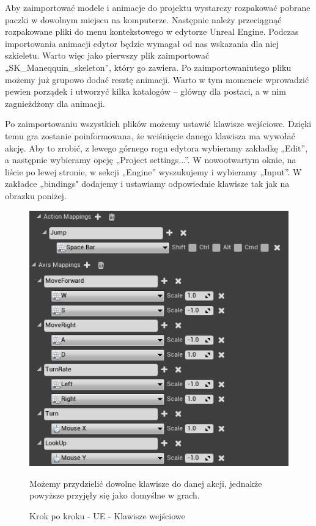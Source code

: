 \documentclass[12pt]{xmgr}
\begin{document}
Aby zaimportować modele i animacje do projektu wystarczy rozpakować pobrane paczki w dowolnym miejscu na komputerze. Następnie należy przeciągnąć rozpakowane pliki do menu kontekstowego w edytorze Unreal Engine. Podczas importowania animacji edytor będzie wymagał od nas wskazania dla niej szkieletu. Warto więc jako pierwszy plik zaimportować „SK\_Maneqquin\_skeleton”, który go zawiera. Po zaimportowaniutego pliku możemy już grupowo dodać resztę animacji. Warto w tym momencie wprowadzić pewien porządek i utworzyć kilka katalogów – główny dla postaci, a w nim zagnieżdżony dla animacji.

Po zaimportowaniu wszystkich plików możemy ustawić klawisze wejściowe. Dzięki temu gra zostanie poinformowana, że wciśnięcie danego klawisza ma wywołać akcję. Aby to zrobić, z lewego górnego rogu edytora wybieramy zakładkę „Edit”, a następnie wybieramy opcję „Project settings...”. W nowootwartym oknie, na liście po lewej stronie, w sekcji „Engine” wyszukujemy i wybieramy „Input”. W zakładce „bindings" dodajemy i ustawiamy odpowiednie klawisze tak jak na obrazku poniżej.

\newpage
\begin{figure}[!htb]
    \begin{center}
    \includegraphics[scale=0.75]{Screeny/UeKrokPoKroku/UE-Inputs.png}
    \end{center}
    \caption{Krok po kroku - UE - Klawisze wejściowe}
     Możemy przydzielić dowolne klawisze do danej akcji, jednakże powyższe przyjęły się jako domyślne w grach.
\end{figure}
\end{document}
